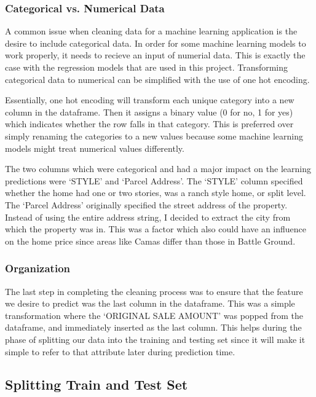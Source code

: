 \documentclass[12pt]{article}
\begin{document}
        \subsubsection{Categorical vs. Numerical Data}
        A common issue when cleaning data for a machine learning application is the desire to include categorical data. In order for 
        some machine learning models to work properly, it needs to recieve an input of numerial data. This is exactly the case with 
        the regression models that are used in this project. Transforming categorical data to numerical can be simplified with the use 
        of one hot encoding. 
        
        Essentially, one hot encoding will transform each unique category into a new column in the dataframe. Then 
        it assigns a binary value (0 for no, 1 for yes) which indicates whether the row falls in that category. This is preferred over 
        simply renaming the categories to a new values because some machine learning models might treat numerical values differently.

        The two columns which were categorical and had a major impact on the learning predictions were `STYLE' and `Parcel Address'. The 
        `STYLE' column specified whether the home had one or two stories, was a ranch style home, or split level. The `Parcel Address' 
        originally specified the street address of the property. Instead of using the entire address string, I decided to extract the city 
        from which the property was in. This was a factor which also could have an influence on the home price since areas like Camas differ 
        than those in Battle Ground. 

        \subsubsection{Organization}
        The last step in completing the cleaning process was to ensure that the feature we desire to predict was the last column in the 
        dataframe. This was a simple transformation where the `ORIGINAL SALE AMOUNT' was popped from the dataframe, and immediately inserted 
        as the last column. This helps during the phase of splitting our data into the training and testing set since it will make it simple to 
        refer to that attribute later during prediction time.

    \subsection{Splitting Train and Test Set}
\end{document}
